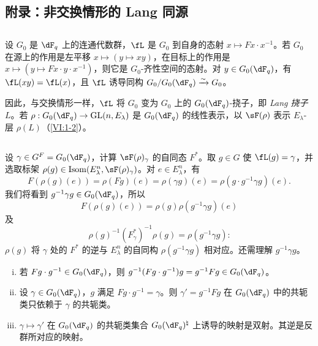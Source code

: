 \subsection*{附录：非交换情形的 Lang 同源}

\subsection{}\label{VI:1-22}

设 $G_0$ 是 $\dF_q$ 上的连通代数群，$\fL$ 是 $G_0$ 到自身的态射 $x\mapsto F x\cdot x^{-1}$。若 $G_0$ 在源上的作用是左平移 $x\mapsto (y\mapsto x y)$，在目标上的作用是 $x\mapsto (y\mapsto F x\cdot y\cdot x^{-1})$，则它是 $G_0$-齐性空间的态射。对 $y\in G_0(\dF_q)$，有 $\fL(xy) = \fL(x)$，且 $\fL$ 诱导同构 $G_0/G_0(\dF_q)\iso G_0$。

因此，与交换情形一样，$\fL$ 将 $G_0$ 变为 $G_0$ 上的 $G_0(\dF_q)$-挠子，即 \emph{Lang 挠子} $L$。若 $\rho:G_0(\dF_q) \to \gl(n,E_\lambda)$ 是 $G_0(\dF_q)$ 的线性表示，以 $\sF(\rho)$ 表示 $E_\lambda$-层 $\rho(L)$（\ref{VI:1-2}）。

\subsection{}\label{VI:1-23}

设 $\gamma\in G^F=G_0(\dF_q)$，计算 $\sF(\rho)_\gamma$ 的自同态 $F^\ast$。取 $g\in G$ 使 $\fL(g)=\gamma$，并选取标架 $\rho(g)\in \operatorname{Isom}(E_\lambda^n,\sF(\rho)_\gamma)$。对 $e\in E_\lambda^n$，有
\[
  F(\rho(g)(e)) = \rho(F g)(e) = \rho(\gamma g)(e) = \rho(g\cdot g^{-1}\gamma g)(e) \text{.}
\]
我们将看到 $g^{-1} \gamma g\in G_0(\dF_q)$，所以
\[
  F(\rho(g)(e)) = \rho(g) \rho(g^{-1}\gamma g)(e)
\]
及
\begin{equation*}\tag{1.23.1}\label{VI:eq:1-23-1}
  \rho(g)^{-1} (F_\gamma^\ast)^{-1} \rho(g) = \rho(g^{-1} \gamma g) \text{:}
\end{equation*}
$\rho(g)$ 将 $\gamma$ 处的 $F^\ast$ 的逆与 $E_\lambda^n$ 的自同构 $\rho(g^{-1} \gamma g)$ 相对应。还需理解 $g^{-1} \gamma g$。

\begin{lemma_}\label{VI:1-24}
\begin{enumerate}[(i)]
  \item 若 $F g\cdot g^{-1} \in G_0(\dF_q)$，则 $g^{-1} (F g\cdot g^{-1}) g = g^{-1} F g\in G_0(\dF_q)$。
  \item 设 $\gamma\in G_0(\dF_q)$，$g$ 满足 $F g\cdot g^{-1} = \gamma$。则 $\gamma'=g^{-1} Fg$ 在 $G_0(\dF_q)$ 中的共轭类只依赖于 $\gamma$ 的共轭类。
  \item $\gamma\mapsto \gamma'$ 在 $G_0(\dF_q)$ 的共轭类集合 $G_0(\dF_q)^\natural$ 上诱导的映射是双射。其逆是反群所对应的映射。
\end{enumerate}
\end{lemma_}

